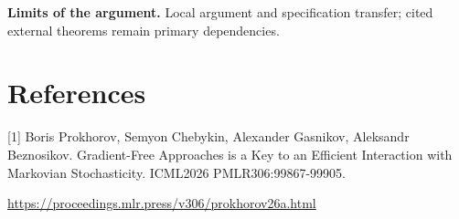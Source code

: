 \documentclass[10pt,a4paper]{article}
\begin{document}
\textbf{Limits of the argument.} Local argument and specification transfer; cited external theorems remain primary dependencies.

\section{References}
[1] Boris Prokhorov, Semyon Chebykin, Alexander Gasnikov, Aleksandr Beznosikov. Gradient-Free Approaches is a Key to an Efficient Interaction with Markovian Stochasticity. ICML2026 PMLR306:99867-99905.

\url{https://proceedings.mlr.press/v306/prokhorov26a.html}
\end{document}
